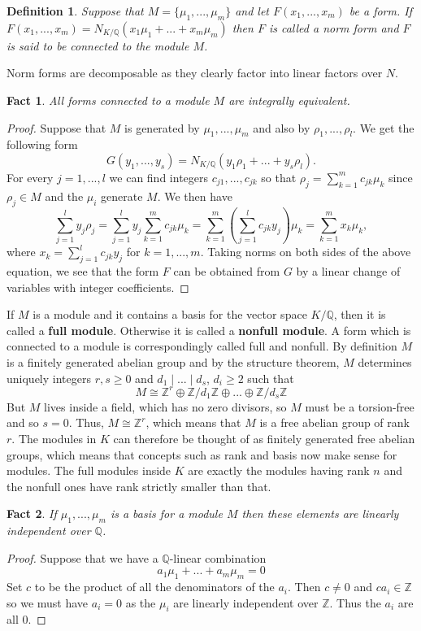 \documentclass{article}
\newtheorem{definition}{Definition}[section]
\newtheorem{fact}{Fact}[section]
\newcommand{\mbb}[1]{\mathbb{#1}}
\numberwithin{equation}{section}
\begin{document}
\begin{definition}
    Suppose that $M = \{\mu_1, ..., \mu_m\}$ and let $F(x_1,...,x_m)$ be a form. If $F(x_1, ..., x_m) = N_{K / \mbb Q}(x_1 \mu_1 + ... + x_m \mu_m)$ then $F$ is called a norm form and $F$ is said to be connected to the module $M$.
\end{definition}
Norm forms are decomposable as they clearly factor into linear factors over $N$.

\begin{fact}\label{fact: Forms connected to module are equivalent}
    All forms connected to a module $M$ are integrally equivalent.
\end{fact}
\begin{proof}
    Suppose that $M$ is generated by $\mu_1, ..., \mu_m$ and also by $\rho_1, ...,\rho_l$. We get the following form
    $$G(y_1, ..., y_s) = N_{K/\mbb Q}(y_1 \rho_1 + ... + y_s \rho_l).$$
    For every $j = 1, ..., l$ we can find integers $c_{j1}, ..., c_{jk}$ so that
    $\rho_j = \sum_{k=1}^m c_{jk} \mu_k$ since $\rho_j \in M$ and the $\mu_i$ generate $M$. We then have
    $$\sum_{j=1}^l y_j \rho_j = \sum_{j=1}^l y_j \sum_{k=1}^m c_{jk} \mu_k = \sum_{k=1}^m (\sum_{j=1}^l c_{jk} y_j) \mu_k = \sum_{k=1}^m x_k \mu_k,$$
    where $x_k = \sum_{j=1}^l c_{jk} y_j$ for $k = 1, ..., m$. Taking norms on both sides of the above equation, we see that the form $F$ can be obtained from $G$ by a linear change of variables with integer coefficients.
\end{proof}
If $M$ is a module and it contains a basis for the vector space $K / \mbb{Q}$, then it is called a \textbf{full module}. Otherwise it is called a \textbf{nonfull module}. A form which is connected to a module is correspondingly called full and nonfull. By definition $M$ is a finitely generated abelian group and by the structure theorem, $M$ determines uniquely integers $r,s \geq 0$ and $d_1 \mid ... \mid d_s$, $d_i \geq 2$ such that
$$M \cong \mbb{Z}^r \oplus \mbb{Z}/d_1\mbb{Z} \oplus ... \oplus \mbb{Z}/d_s\mbb{Z} $$
But $M$ lives inside a field, which has no zero divisors, so $M$ must be a torsion-free and so $s = 0$. Thus, $M \cong \mbb{Z}^r$, which means that $M$ is a free abelian group of rank $r$. The modules in $K$ can therefore be thought of as finitely generated free abelian groups, which means that concepts such as rank and basis now make sense for modules. The full modules inside $K$ are exactly the modules having rank $n$ and the nonfull ones have rank strictly smaller than that.

\begin{fact}\label{lem: Basis for module is linearly independent over Q}
    If $\mu_1, ..., \mu_m$ is a basis for a module $M$ then these elements are linearly independent over $\mbb Q$.
\end{fact}
\begin{proof}
    Suppose that we have a $\mbb Q$-linear combination
    $$a_1 \mu_1 + ... + a_m \mu_m = 0$$
    Set $c$ to be the product of all the denominators of the $a_i$. Then $c \neq 0$ and $ca_i \in \mbb Z$ so we must have $a_i = 0$ as the $\mu_i$ are linearly independent over $\mbb Z$. Thus the $a_i$ are all 0.
\end{proof}
\end{document}
